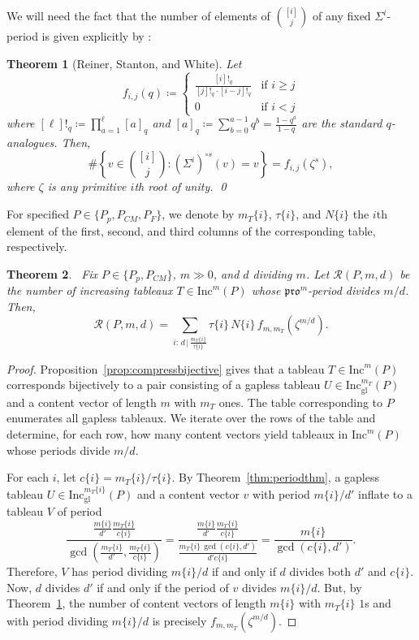 \documentclass[12pt]{amsart}
\newtheorem{theorem}{Theorem}[section]
\theoremstyle{definition}
\theoremstyle{remark}
\numberwithin{equation}{section}
\newcommand{\inc}{\ensuremath{\mathrm{Inc}}}
\newcommand{\incgl}{\inc_{\mathrm{gl}}}
\newcommand{\pro}{\mathfrak{pro}}
\begin{document}
We will need the fact that the number of elements of $\binom{[i]}{j}$ of any fixed $\Sigma^i$-period is given explicitly by \cite[Theorem~1.1(b)]{Reiner.Stanton.White}:
\begin{theorem}[Reiner, Stanton, and White]\label{thm:rsw}
Let 
\begin{equation*}
f_{i,j}(q) \coloneqq 
\begin{cases}
 \frac{[i]!_q}{[j]!_q\cdot [i-j]!_q} & \text{if } i \geq j \\
 0 & \text{if } i < j 
\end{cases}
\end{equation*}
where $[\ell]!_q \coloneqq \prod_{a=1}^\ell [a]_q$ and $[a]_q \coloneqq \sum_{b = 0}^{a-1} q^b = \frac{1-q^{a}}{1-q}$ are the standard $q$-analogues. Then, 
\[\#\left\{ v \in \binom{[i]}{j} : (\Sigma^i)^{\circ s}(v) = v \right\} = f_{i,j}(\zeta^s),\] where $\zeta$ is any primitive $i$th root of unity. \qed
\end{theorem} 

For specified $P \in \{P_p, P_{CM}, P_F\}$, we denote by $m_T\{i\}$, $\tau\{i\}$, and $N\{i\}$ the $i$th element of the first, second, and third columns of the corresponding table, respectively. 
\\

\begin{theorem}~\label{thm:mainresult}
Fix $P \in \lbrace  P_p, P_{CM} \rbrace$, $m \gg 0$, and $d$ dividing $m$. Let $\mathcal{R}(P,m,d)$ be the number of increasing tableaux $T \in \inc^m(P)$ whose $\pro^m$-period divides $m/d$. Then,
\begin{equation}\label{eq:mainresulteq} 
\mathcal{R}(P,m,d)  = \sum \limits_{i: \, d \, \vert \, \frac{m_T\{i\}}{\tau\{i\}}} \tau\{i\} \, N\{i\} \, f_{m,m_T}(\zeta^{m/d}).
\end{equation}
\end{theorem}
\begin{proof}
Proposition~\ref{prop:compressbijective} gives that a tableau $T \in \inc^m(P)$ corresponds bijectively to a pair consisting of a gapless tableau $U \in \incgl^{m_T}(P)$ and a content vector of length $m$ with $m_T$ ones. The table corresponding to $P$ enumerates all gapless tableaux. We iterate over the rows of the table and determine, for each row, how many content vectors yield tableaux in $\inc^m(P)$ whose periods divide $m/d$. 

For each $i$, let $c\{i\} = m_T\{i\}/\tau\{i\}$. By Theorem~\ref{thm:periodthm}, a gapless tableau $U \in \incgl^{m_T\{i\}}(P)$ and a content vector $v$ with period $m\{i\}/d'$ inflate to a tableau $V$ of period \[ \frac{\frac{m\{i\}}{d'} \frac{m_T\{i\}}{c\{i\}}}{\gcd(\frac{m_T\{i\}}{d'},\frac{m_T\{i\}}{c\{i\}})} = \frac{\frac{m\{i\}}{d'} \frac{m_T\{i\}}{c\{i\}}}{\frac{m_T\{i\} \, \gcd(c\{i\},d')}{d' c\{i\}}} = \frac{m\{i\}}{\gcd(c\{i\},d')}. \] 
Therefore, $V$ has period dividing $m\{i\}/d$ if and only if $d$ divides both $d'$ and $c\{i\}$. Now, $d$ divides $d'$ if and only if the period of $v$ divides $m\{i\}/d$. But, by Theorem~\ref{thm:rsw}, the number of content vectors of length $m\{i\}$ with $m_T\{i\}$ $1$s and with period dividing $m\{i\}/d$ is precisely $f_{m,m_T}(\zeta^{m/d})$.
\end{proof}
\end{document}
